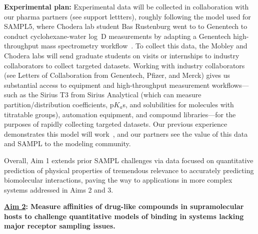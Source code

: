 \documentclass[11pt]{article}
\begin{document}
{\bf Experimental plan:}
Experimental data will be collected in collaboration with our pharma partners (see support lettters), roughly following the model used for SAMPL5, where Chodera lab student Bas Rustenburg went to to Genentech to conduct cyclohexane-water log~D measurements by adapting a Genentech high-throughput mass spectrometry workflow~\cite{rustenburg_measuring_2016}.
To collect this data, the Mobley and Chodera labs will send graduate students on visits or internships to industry collaborators to collect targeted datasets.
Working with industry collaborators (see Letters of Collaboration from Genentech, Pfizer, and Merck) gives us substantial access to equipment and high-throughput measurement workflows---such as the Sirius T3 from Sirius Analytical (which can measure partition/distribution coefficients, p$K_a$s, and solubilities for molecules with titratable groups), automation equipment, and compound libraries---for the purposes of rapidly collecting targeted datasets.
Our previous experience demonstrates this model will work~\cite{rustenburg_measuring_2016}, and our partners see the value of this data and SAMPL to the modeling community.

Overall, Aim 1 extends prior SAMPL challenges via data focused on quantitative prediction of physical properties of tremendous relevance to accurately predicting biomolecular interactions, paving the way to applications in more complex systems addressed in Aims 2 and 3.

\textbf{\underline{Aim 2}: Measure affinities of drug-like compounds in supramolecular hosts to challenge quantitative models of binding in systems lacking major receptor sampling issues.}
\end{document}
